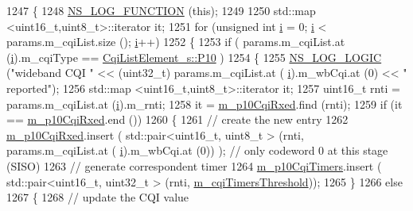 \begin{DoxyCode}
1247 \{
1248   \hyperlink{log-macros-disabled_8h_a90b90d5bad1f39cb1b64923ea94c0761}{NS\_LOG\_FUNCTION} (\textcolor{keyword}{this});
1249 
1250   std::map <uint16\_t,uint8\_t>::iterator it;
1251   \textcolor{keywordflow}{for} (\textcolor{keywordtype}{unsigned} \textcolor{keywordtype}{int} \hyperlink{bernuolliDistribution_8m_a6f6ccfcf58b31cb6412107d9d5281426}{i} = 0; \hyperlink{bernuolliDistribution_8m_a6f6ccfcf58b31cb6412107d9d5281426}{i} < params.m\_cqiList.size (); \hyperlink{bernuolliDistribution_8m_a6f6ccfcf58b31cb6412107d9d5281426}{i}++)
1252     \{
1253       \textcolor{keywordflow}{if} ( params.m\_cqiList.at (\hyperlink{bernuolliDistribution_8m_a6f6ccfcf58b31cb6412107d9d5281426}{i}).m\_cqiType == \hyperlink{structns3_1_1CqiListElement__s_a8f1bd827fd9842e7c07e39265d88299aa9db5a80433fbf06a4c98935e28ad26e8}{CqiListElement\_s::P10} )
1254         \{
1255           \hyperlink{group__logging_ga88acd260151caf2db9c0fc84997f45ce}{NS\_LOG\_LOGIC} (\textcolor{stringliteral}{"wideband CQI "} <<  (uint32\_t) params.m\_cqiList.at (
      \hyperlink{bernuolliDistribution_8m_a6f6ccfcf58b31cb6412107d9d5281426}{i}).m\_wbCqi.at (0) << \textcolor{stringliteral}{" reported"});
1256           std::map <uint16\_t,uint8\_t>::iterator it;
1257           uint16\_t rnti = params.m\_cqiList.at (\hyperlink{bernuolliDistribution_8m_a6f6ccfcf58b31cb6412107d9d5281426}{i}).m\_rnti;
1258           it = \hyperlink{classns3_1_1RrFfMacScheduler_aabdb8d68324faae8a279df6378d589b7}{m\_p10CqiRxed}.find (rnti);
1259           \textcolor{keywordflow}{if} (it == \hyperlink{classns3_1_1RrFfMacScheduler_aabdb8d68324faae8a279df6378d589b7}{m\_p10CqiRxed}.end ())
1260             \{
1261               \textcolor{comment}{// create the new entry}
1262               \hyperlink{classns3_1_1RrFfMacScheduler_aabdb8d68324faae8a279df6378d589b7}{m\_p10CqiRxed}.insert ( std::pair<uint16\_t, uint8\_t > (rnti, params.m\_cqiList.at (
      \hyperlink{bernuolliDistribution_8m_a6f6ccfcf58b31cb6412107d9d5281426}{i}).m\_wbCqi.at (0)) ); \textcolor{comment}{// only codeword 0 at this stage (SISO)}
1263               \textcolor{comment}{// generate correspondent timer}
1264               \hyperlink{classns3_1_1RrFfMacScheduler_a1c5527d9b000ec9f4998595b47d54ad2}{m\_p10CqiTimers}.insert ( std::pair<uint16\_t, uint32\_t > (rnti, 
      \hyperlink{classns3_1_1RrFfMacScheduler_a51ae1963d7d95e89917af4c603f08a91}{m\_cqiTimersThreshold}));
1265             \}
1266           \textcolor{keywordflow}{else}
1267             \{
1268               \textcolor{comment}{// update the CQI value}

\end{DoxyCode}
